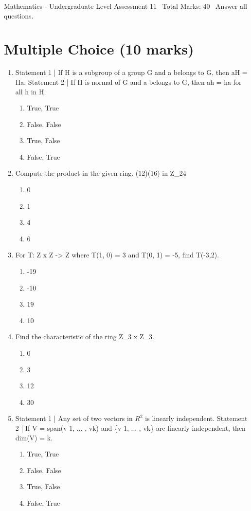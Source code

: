 \documentclass[12pt]{article}
\begin{document}
\begin{center}
Mathematics - Undergraduate Level Assessment 11 \
Total Marks: 40 \
Answer all questions.
\end{center}

\section*{Multiple Choice (10 marks)}
\begin{enumerate}[label=\arabic*.]
\item Statement 1 | If H is a subgroup of a group G and a belongs to G, then aH = Ha. Statement 2 | If H is normal of G and a belongs to G, then ah = ha for all h in H.
\begin{enumerate}[label=(\alph*)]
    \item True, True
    \item False, False
    \item True, False
    \item False, True
\end{enumerate}
\item Compute the product in the given ring. (12)(16) in Z\_24
\begin{enumerate}[label=(\alph*)]
    \item 0
    \item 1
    \item 4
    \item 6
\end{enumerate}
\item For T: Z x Z -\textgreater{} Z where T(1, 0) = 3 and T(0, 1) = -5, find T(-3,2).
\begin{enumerate}[label=(\alph*)]
    \item -19
    \item -10
    \item 19
    \item 10
\end{enumerate}
\item Find the characteristic of the ring Z\_3 x Z\_3.
\begin{enumerate}[label=(\alph*)]
    \item 0
    \item 3
    \item 12
    \item 30
\end{enumerate}
\item Statement 1 | Any set of two vectors in $R^2$ is linearly independent. Statement 2 | If V = span(v 1, ... , vk) and \{v 1, ... , vk\} are linearly independent, then dim(V) = k.
\begin{enumerate}[label=(\alph*)]
    \item True, True
    \item False, False
    \item True, False
    \item False, True
\end{enumerate}
\end{enumerate}
\end{document}
